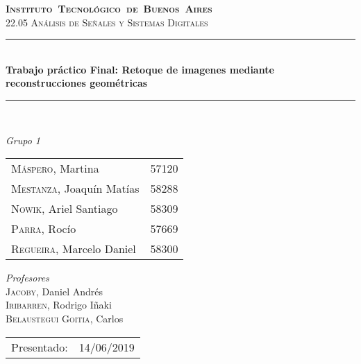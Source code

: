 \begin{titlepage}
\newcommand{\HRule}{\rule{\linewidth}{0.5mm}}
\center
\mbox{\textsc{\LARGE \bfseries {Instituto Tecnol\'ogico de Buenos Aires}}}\\[1.5cm]
\textsc{\Large 22.05 An\'alisis de Se\~nales y Sistemas Digitales}\\[0.5cm]


\HRule \\[0.6cm]
{ \Huge \bfseries Trabajo pr\'actico Final: Retoque de imagenes mediante reconstrucciones geométricas}\\[0.4cm] %
\HRule \\[1.5cm]


{\large

\emph{Grupo 1}\\
\vspace{3px}

\begin{tabular}{lr} 	
\textsc{M\'aspero}, Martina  & 57120 \\
\textsc{Mestanza}, Joaqu\'in Mat\'ias  & 58288 \\
\textsc{Nowik}, Ariel Santiago  & 58309 \\
\textsc{Parra}, Roc\'io  & 57669 \\
\textsc{Regueira}, Marcelo Daniel  & 58300 \\
\end{tabular}

\vspace{20px}

\emph{Profesores}\\
\vspace{3px}
\textsc{Jacoby}, Daniel Andr\'es\\ 	
\textsc{Iribarren}, Rodrigo I\~naki\\ 	
\textsc{Belaustegui Goitia}, Carlos\\ 	

\vspace{100px}

\begin{tabular}{ll}

Presentado: & 14/06/2019\\

\end{tabular}

}

\vfill

\end{titlepage}